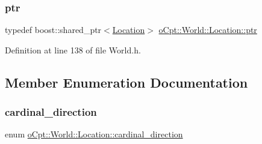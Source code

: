 \subsubsection{\texorpdfstring{ptr}{ptr}}
{\footnotesize\ttfamily typedef boost\+::shared\+\_\+ptr$<$\hyperlink{classo_cpt_1_1_world_1_1_location}{Location}$>$ \hyperlink{classo_cpt_1_1_world_1_1_location_a33b7d6b8797958b6e4d792dfeaa6d160}{o\+Cpt\+::\+World\+::\+Location\+::ptr}}



Definition at line 138 of file World.\+h.



\subsection{Member Enumeration Documentation}
\hypertarget{classo_cpt_1_1_world_1_1_location_aa37d99a87b49ccc38470dcc6cc64ced5}{}\label{classo_cpt_1_1_world_1_1_location_aa37d99a87b49ccc38470dcc6cc64ced5} 
\subsubsection{\texorpdfstring{cardinal\+\_\+direction}{cardinal\_direction}}
{\footnotesize\ttfamily enum \hyperlink{classo_cpt_1_1_world_1_1_location_aa37d99a87b49ccc38470dcc6cc64ced5}{o\+Cpt\+::\+World\+::\+Location\+::cardinal\+\_\+direction}}

